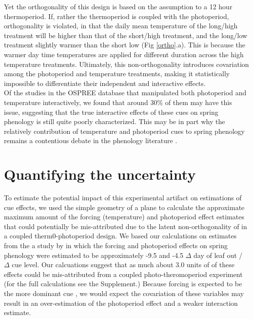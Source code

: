 \documentclass[11pt]{article}
\begin{document}
Yet the orthogonality of this design is based on the assumption to a 12 hour thermoperiod. If, rather the thermoperiod is coupled with the photoperiod, orthogonality is violated, in that the daily mean temperature of the long/high treatment will be higher than that of the short/high treatment, and the long/low treatment slightly warmer than the short low (Fig \ref{ortho}.a). This is because the warmer day time temperatures are applied for different duration across the high temperature treatments. Ultimately, this non-orthogonality introduces covariation among the photoperiod and temperature treatments, making it statistically impossible to differentiate their independent and interactive effects.\\

Of the studies in the OSPREE database that manipulated both photoperiod and temperature interactively, we found that around 30\% of them may have this issue, suggesting that the true interactive effects of these cues on spring phenology is still quite poorly characterized. This may be in part why the relatively contribution of temperature and photoperiod cues to spring phenology remains a contentious debate in the phenology literature \citep{}.

\section*{Quantifying the uncertainty}
To estimate the potential impact of this experimental artifact on estimations of cue effects, we used the simple geometry of a plane to calculate the approximate maximum amount of the forcing (temperature) and photoperiod effect estimates that could potentially be mis-attributed due to the latent non-orthogonality of in a coupled therm0-photoperiod design. We based our calculations on estimates from the a study by \citet{} in which the forcing and photoperiod effects on spring phenology were estimated to be approximately -9.5 and -4.5  $\Delta$ day of leaf out / $\Delta$ cue level. Our calcuations suggest that as much about 3.0 units of of these effects could be mis-attributed from a coupled photo-theromoperiod experiment (for the full calculations see the Supplement.) Because forcing is expected to be the more dominant cue \citep{}, we would expect the covariation of these variables may result in an over-estimation of the photoperiod effect and a weaker interaction estimate. \\

\end{document}
